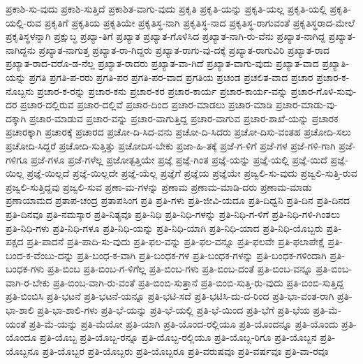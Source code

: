 {ಪ್ರಕಾಶಿ-ಸು-ವುದು
ಪ್ರಕಾಶಿ-ಸುತ್ತಿದೆ
ಪ್ರಕಾಶಿತ-ವಾಗು-ವುದು
ಪ್ರಕೃತಿ
ಪ್ರಕೃತಿ-ಯನ್ನು
ಪ್ರಕೃತಿ-ಯಲ್ಲ
ಪ್ರಕೃತಿ-ಯಲ್ಲಿ
ಪ್ರಕೃತಿ-ಯಲ್ಲಿ-ರುವ
ಪ್ರಕೃತಿಗೆ
ಪ್ರಕೃತಿಯ
ಪ್ರಕೃತಿಯೇ
ಪ್ರಕೃತಿಸ್ಥ-ನಾಗಿ
ಪ್ರಕೃತಿಸ್ಥ-ನಾದ
ಪ್ರಕೃತಿಸ್ಥ-ರಾಗುವಂತೆ
ಪ್ರಕೃತಿಸ್ಥರಾದ-ಮೇಲೆ
ಪ್ರಕೃತಿಸ್ಥಳನ್ನಾಗಿ
ಪ್ರಕ್ಷುಬ್ಧ
ಪ್ರಖ್ಯಾ-ತಿಗೆ
ಪ್ರಖ್ಯಾತ
ಪ್ರಖ್ಯಾತ-ಗೊಳಿಸಿದ
ಪ್ರಖ್ಯಾತ-ನಾಗಿ-ರು-ವೆನು
ಪ್ರಖ್ಯಾತ-ನಾಗಿದ್ದ
ಪ್ರಖ್ಯಾತ-ನಾಗಿದ್ದನು
ಪ್ರಖ್ಯಾತ-ನಾಗುತ್ತ
ಪ್ರಖ್ಯಾತ-ರಾ-ಗಿದ್ದರು
ಪ್ರಖ್ಯಾತ-ರಾಗು-ವು-ದಕ್ಕೆ
ಪ್ರಖ್ಯಾತ-ರಾಗುವಿರಿ
ಪ್ರಖ್ಯಾತ-ರಾದ
ಪ್ರಖ್ಯಾತ-ರಾದ-ವರೊ-ಡ-ನೆಲ್ಲ
ಪ್ರಖ್ಯಾತ-ರಾದರು
ಪ್ರಖ್ಯಾತ-ವಾ-ಗಿದೆ
ಪ್ರಖ್ಯಾತ-ವಾಗು-ವುದು
ಪ್ರಖ್ಯಾತ-ವಾದ
ಪ್ರಖ್ಯಾತಿ-ಯನ್ನು
ಪ್ರಗತಿ
ಪ್ರಗತಿ-ಪ-ರರು
ಪ್ರಗತಿ-ಪರ
ಪ್ರಗತಿ-ಪರ-ವಾದ
ಪ್ರಗತಿಯ
ಪ್ರಚಂಡ
ಪ್ರಚಲಿತ-ವಾದ
ಪ್ರಚಾರ
ಪ್ರಚಾರ-ಕ-ನೊಬ್ಬನು
ಪ್ರಚಾರ-ಕ-ರನ್ನು
ಪ್ರಚಾರ-ಕನು
ಪ್ರಚಾರ-ಕರ
ಪ್ರಚಾರ-ಕಾರ್ಯ
ಪ್ರಚಾರ-ಕಾರ್ಯ-ವನ್ನು
ಪ್ರಚಾರ-ಗೊಳಿ-ಸುವು-ದರ
ಪ್ರಚಾರ-ದಲ್ಲಿರುವ
ಪ್ರಚಾರ-ದಲ್ಲಿವೆ
ಪ್ರಚಾರ-ದಿಂದ
ಪ್ರಚಾರ-ಮಾಡಲು
ಪ್ರಚಾರ-ಮಾಡಿ
ಪ್ರಚಾರ-ಮಾಡು-ವು-ದಕ್ಕಾಗಿ
ಪ್ರಚಾರ-ಮಾಡುವ
ಪ್ರಚಾರ-ವನ್ನು
ಪ್ರಚಾರ-ವಾಗುತ್ತಿದ್ದ
ಪ್ರಚಾರ-ವಾಗುವ
ಪ್ರಚಾರ-ಶಾಖೆ-ಯನ್ನು
ಪ್ರಚಾರಕ
ಪ್ರಚಾರಕ್ಕಾಗಿ
ಪ್ರಚಾರಕ್ಕೆ
ಪ್ರಚಾರದ
ಪ್ರಚೋ-ದಿ-ಸಿದ-ವನು
ಪ್ರಚೋ-ದಿ-ಸಿದರು
ಪ್ರಚೋ-ದಿಸು-ವಂತಹ
ಪ್ರಚೋದಿ-ಸಲು
ಪ್ರಚೋದಿ-ಸಿದ್ದರೆ
ಪ್ರಚೋದಿ-ಸುತ್ತಿತ್ತು
ಪ್ರಚೋದಿಸ-ಬೇಕು
ಪ್ರಜಾ-ಹಿ-ತಕ್ಕೆ
ಪ್ರಜೆ-ಗ-ಳಿಗೆ
ಪ್ರಜೆ-ಗಳ
ಪ್ರಜೆ-ಗಳಿ-ಗಾಗಿ
ಪ್ರಜೆ-ಗಳಿಗೂ
ಪ್ರಜೆ-ಗಳೂ
ಪ್ರಜೆ-ಗಳೆಲ್ಲ
ಪ್ರಜೋತ್ಪತ್ತಿಯೇ
ಪ್ರಜ್ಞೆ
ಪ್ರಜ್ಞೆ-ಗಿಂತ
ಪ್ರಜ್ಞೆ-ಯನ್ನು
ಪ್ರಜ್ಞೆ-ಯಲ್ಲಿ
ಪ್ರಜ್ಞೆ-ಯಿದೆ
ಪ್ರಜ್ಞೆ-ಯಿಲ್ಲ
ಪ್ರಜ್ಞೆ-ಯಿಲ್ಲದೆ
ಪ್ರಜ್ಞೆ-ಯಿಲ್ಲದೇ
ಪ್ರಜ್ಞೆ-ಯೆಲ್ಲ
ಪ್ರಜ್ಞೆಗೆ
ಪ್ರಜ್ಞೆಯ
ಪ್ರಜ್ಞೆಯೇ
ಪ್ರಜ್ವಲಿ-ಸು-ವುದು
ಪ್ರಜ್ವಲಿ-ಸುತ್ತಿ-ರುವ
ಪ್ರಜ್ವಲಿ-ಸುತ್ತಿದ್ದವು
ಪ್ರಜ್ವಲಿ-ಸುವ
ಪ್ರಣಾ-ಮ-ಗಳನ್ನು
ಪ್ರಣಾಮ
ಪ್ರಣಾಮ-ಮಾಡಿ-ದರು
ಪ್ರಣಾಮ-ಮಾಡು
ಪ್ರಣಾಯಾಮದ
ಪ್ರತಾಪ-ಚಂದ್ರ
ಪ್ರತಾಪಸಿಂಗ
ಪ್ರತಿ
ಪ್ರತಿ-ಗಳು
ಪ್ರತಿ-ಜೀವಿ-ಯದೂ
ಪ್ರತಿ-ದಿಧ್ವನಿ
ಪ್ರತಿ-ದಿನ
ಪ್ರತಿ-ದಿನದ
ಪ್ರತಿ-ದಿನವೂ
ಪ್ರತಿ-ನಮಸ್ಕಾರ
ಪ್ರತಿ-ನಿತ್ಯವೂ
ಪ್ರತಿ-ನಿಧಿ
ಪ್ರತಿ-ನಿಧಿ-ಗಳನ್ನು
ಪ್ರತಿ-ನಿಧಿ-ಗ-ಳಿಗೆ
ಪ್ರತಿ-ನಿಧಿ-ಗಳಿ-ಗಿಂತಲು
ಪ್ರತಿ-ನಿಧಿ-ಗಳು
ಪ್ರತಿ-ನಿಧಿ-ಗಳೂ
ಪ್ರತಿ-ನಿಧಿ-ಯನ್ನು
ಪ್ರತಿ-ನಿಧಿ-ಯಾಗಿ
ಪ್ರತಿ-ನಿಧಿ-ಯಾದ
ಪ್ರತಿ-ನಿಧಿ-ಯೊಬ್ಬರು
ಪ್ರತಿ-ಪಕ್ಷದ
ಪ್ರತಿ-ಪಾದನೆ
ಪ್ರತಿ-ಪಾದಿ-ಸು-ವುದು
ಪ್ರತಿ-ಫಲ-ವನ್ನು
ಪ್ರತಿ-ಫಲ-ವನ್ನೂ
ಪ್ರತಿ-ಫಲವೇ
ಪ್ರತಿ-ಫಲಾಪೇಕ್ಷೆ
ಪ್ರತಿ-ಬಂದ-ಕ-ವೆಂಬು-ದನ್ನು
ಪ್ರತಿ-ಬಂಧ-ಕ-ವಾಗಿ
ಪ್ರತಿ-ಬಂಧಕ-ಗಳ
ಪ್ರತಿ-ಬಂಧಕ-ಗಳನ್ನು
ಪ್ರತಿ-ಬಂಧಕ-ಗಳಿಂದಾಗಿ
ಪ್ರತಿ-ಬಂಧಕ-ಗಳು
ಪ್ರತಿ-ಬಿಂಬ
ಪ್ರತಿ-ಬಿಂಬ-ಗ-ಳಿಗೆಲ್ಲ
ಪ್ರತಿ-ಬಿಂಬ-ಗಳು
ಪ್ರತಿ-ಬಿಂಬ-ದಂತೆ
ಪ್ರತಿ-ಬಿಂಬ-ವನ್ನೂ
ಪ್ರತಿ-ಬಿಂಬ-ವಾಗಿ-ರ-ಬೇಕು
ಪ್ರತಿ-ಬಿಂಬ-ವಾಗಿ-ರು-ವಂತೆ
ಪ್ರತಿ-ಬಿಂಬಿ-ಸುತ್ತಾನೆ
ಪ್ರತಿ-ಬಿಂಬಿ-ಸುತ್ತಿ-ರು-ವುದು
ಪ್ರತಿ-ಬಿಂಬಿ-ಸುತ್ತಿದ್ದ
ಪ್ರತಿ-ಬಿಂಬಿಸಿ
ಪ್ರತಿ-ಭಟನೆ
ಪ್ರತಿ-ಭಟನೆ-ಯನ್ನೂ
ಪ್ರತಿ-ಭಟಿ-ಸದೆ
ಪ್ರತಿ-ಭಟಿಸಿ-ದು-ದ-ರಿಂದ
ಪ್ರತಿ-ಭಾ-ವಂತ-ರಾಗಿ
ಪ್ರತಿ-ಭಾ-ಶಾಲಿ
ಪ್ರತಿ-ಭಾ-ಶಾಲಿ-ಗಳು
ಪ್ರತಿ-ಭೆ-ಯನ್ನು
ಪ್ರತಿ-ಭೆ-ಯಲ್ಲಿ
ಪ್ರತಿ-ಭೆ-ಯಿಂದ
ಪ್ರತಿ-ಭೆಗೆ
ಪ್ರತಿ-ಭೆಯ
ಪ್ರತಿ-ಮೆ-ಯಂತೆ
ಪ್ರತಿ-ಮೆ-ಯನ್ನು
ಪ್ರತಿ-ಮೆಯೋ
ಪ್ರತಿ-ಯಾಗಿ
ಪ್ರತಿ-ಯೊಂದ-ರಲ್ಲಿಯೂ
ಪ್ರತಿ-ಯೊಂದನ್ನೂ
ಪ್ರತಿ-ಯೊಂದು
ಪ್ರತಿ-ಯೊಂದೂ
ಪ್ರತಿ-ಯೊಬ್ಬ
ಪ್ರತಿ-ಯೊಬ್ಬ-ರನ್ನೂ
ಪ್ರತಿ-ಯೊಬ್ಬ-ರಲ್ಲಿಯೂ
ಪ್ರತಿ-ಯೊಬ್ಬ-ರಿಗೂ
ಪ್ರತಿ-ಯೊಬ್ಬನ
ಪ್ರತಿ-ಯೊಬ್ಬನೂ
ಪ್ರತಿ-ಯೊಬ್ಬರ
ಪ್ರತಿ-ಯೊಬ್ಬರು
ಪ್ರತಿ-ಯೊಬ್ಬರೂ
ಪ್ರತಿ-ವರುಷವೂ
ಪ್ರತಿ-ವರ್ಷವೂ
ಪ್ರತಿ-ವಾ-ರವೂ
}

